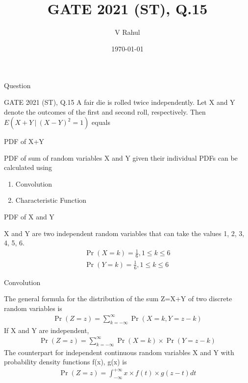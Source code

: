 \documentclass{beamer}
\title{GATE 2021 (ST), Q.15}
\author{V Rahul}
\institute{IITH}
\date{\today}
\providecommand{\brak}[1]{\ensuremath{\left(#1\right)}}
\begin{document}
\begin{frame}
    \titlepage
\end{frame}
\begin{frame}{Question}
    \begin{block}{GATE 2021 (ST), Q.15}
        A fair die is rolled twice independently. Let X and Y denote the outcomes of the first and second roll, respectively. Then $E(X+Y\:|\:(X-Y)^2=1)$ equals
    \end{block}
\end{frame}
\begin{frame}{PDF of X+Y}
    \begin{block}{}
        PDF of sum of random variables X and Y given their individual PDFs can be calculated using
        \begin{enumerate}
            \item Convolution
            \item Characteristic Function
        \end{enumerate}
    \end{block}
\end{frame}
\begin{frame}{PDF of X and Y}
    \begin{block}{}
        X and Y are two independent random variables that can take the values 1, 2, 3, 4, 5, 6.
        \begin{align}
            \Pr\brak{X=k}=\frac{1}{6}, 1\leq k \leq 6\\
            \Pr\brak{Y=k}=\frac{1}{6}, 1\leq k \leq 6
        \end{align}
    \end{block}
\end{frame}
\begin{frame}{Convolution}
    \begin{block}{}
        The general formula for the distribution of the sum Z=X+Y of two discrete random variables is
        \begin{align}
            \Pr\brak{Z=z} = \sum_{k=-\infty}^{\infty} \Pr\brak{X=k,Y=z-k}
        \end{align}
        If X and Y are independent,
        \begin{align}
            \Pr\brak{Z=z} = \sum_{k=-\infty}^{\infty} \Pr\brak{X=k}\times\Pr\brak{Y=z-k}
        \end{align}
        The counterpart for independent continuous random variables X and Y with probability density functions f(x), g(x) is
        \begin{align}
            \Pr\brak{Z=z}=\int_{-\infty}^{+\infty} x\times f(t)\times g(z-t)dt
        \end{align}
    \end{block}
\end{frame}
\end{document}
